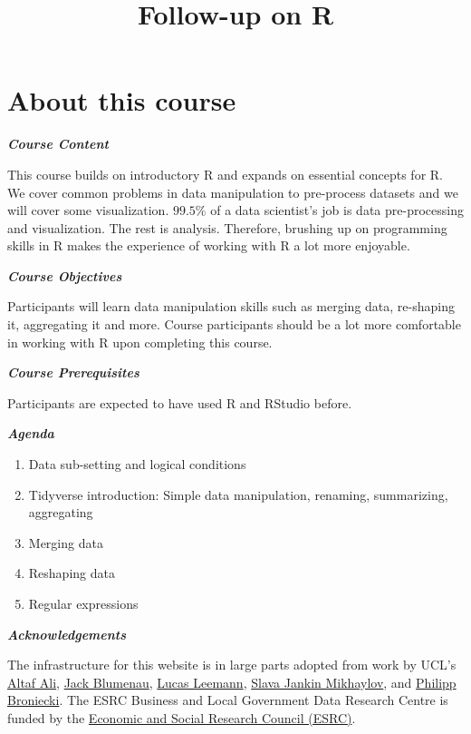 \documentclass[]{article}
\title{Follow-up on R}
\author{}
\date{}
\providecommand{\tightlist}{%
  \setlength{\itemsep}{0pt}\setlength{\parskip}{0pt}}
\begin{document}
\maketitle

{
\setcounter{tocdepth}{2}
\tableofcontents
}
\hypertarget{about-this-course}{%
\section*{About this course}\label{about-this-course}}

\textbf{\emph{Course Content}}

This course builds on introductory R and expands on essential concepts for R. We cover common problems in data manipulation to pre-process datasets and we will cover some visualization. \(99.5\%\) of a data scientist's job is data pre-processing and visualization. The rest is analysis. Therefore, brushing up on programming skills in R makes the experience of working with R a lot more enjoyable.

\textbf{\emph{Course Objectives}}

Participants will learn data manipulation skills such as merging data, re-shaping it, aggregating it and more. Course participants should be a lot more comfortable in working with R upon completing this course.

\textbf{\emph{Course Prerequisites}}

Participants are expected to have used R and RStudio before.

\textbf{\emph{Agenda}}

\begin{enumerate}
\def\labelenumi{\arabic{enumi}.}
\tightlist
\item
  Data sub-setting and logical conditions
\item
  Tidyverse introduction: Simple data manipulation, renaming, summarizing, aggregating
\item
  Merging data
\item
  Reshaping data
\item
  Regular expressions
\end{enumerate}

\textbf{\emph{Acknowledgements}}

The infrastructure for this website is in large parts adopted from work by UCL's \href{https://iris.ucl.ac.uk/iris/browse/profile?upi=ALIAX58}{Altaf Ali}, \href{https://www.jackblumenau.com/}{Jack Blumenau}, \href{https://lucasleemann.ch}{Lucas Leemann}, \href{https://sjankin.com/}{Slava Jankin Mikhaylov}, and \href{https://philippbroniecki.com}{Philipp Broniecki}. The ESRC Business and Local Government Data Research Centre is funded by the \href{https://esrc.ukri.org}{Economic and Social Research Council (ESRC)}.
\end{document}
